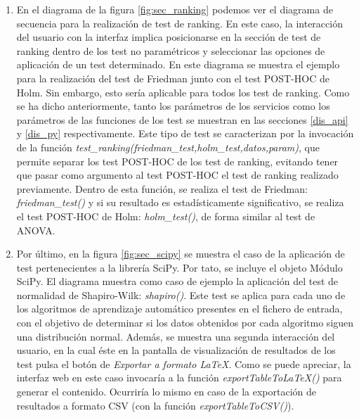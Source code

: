 \begin{enumerate}
\item En el diagrama de la figura \ref*{fig:sec_ranking} podemos ver el diagrama de secuencia para la realización de test de ranking. En este caso, la interacción del usuario con la interfaz implica posicionarse en la sección de test de ranking dentro de los test no paramétricos y seleccionar las opciones de aplicación de un test determinado. En este diagrama se muestra el ejemplo para la realización del test de Friedman junto con el test POST-HOC de Holm. Sin embargo, esto sería aplicable para todos los test de ranking. Como se ha dicho anteriormente, tanto los parámetros de los servicios como los parámetros de las funciones de los test se muestran en las secciones \ref{dis_api} y \ref{dis_py} respectivamente. Este tipo de test se caracterizan por la invocación de la función \textit{test\_ranking(friedman\_test,holm\_test,datos,param)}, que permite separar los test POST-HOC de los test de ranking, evitando tener que pasar como argumento al test POST-HOC el test de ranking realizado previamente. Dentro de esta función, se realiza el test de Friedman: \textit{friedman\_test()} y si su resultado es estadísticamente significativo, se realiza el test POST-HOC de Holm: \textit{holm\_test()}, de forma similar al test de ANOVA.

\item Por último, en la figura \ref{fig:sec_scipy} se muestra el caso de la aplicación de test pertenecientes a la librería SciPy. Por tato, se incluye el objeto Módulo SciPy. El diagrama muestra como caso de ejemplo la aplicación del test de normalidad de Shapiro-Wilk: \textit{shapiro()}. Este test se aplica para cada uno de los algoritmos de aprendizaje automático presentes en el fichero de entrada, con el objetivo de determinar si los datos obtenidos por cada algoritmo siguen una distribución normal. Además, se muestra una segunda interacción del usuario, en la cual éste en la pantalla de visualización de resultados de los test pulsa el botón de \textit{Exportar a formato \LaTeX}. Como se puede apreciar, la interfaz web en este caso invocaría  a la función \textit{exportTableToLaTeX()} para generar el contenido. Ocurriría lo mismo en caso de la exportación de resultados a formato CSV (con la función \textit{exportTableToCSV()}).


\end{enumerate}
